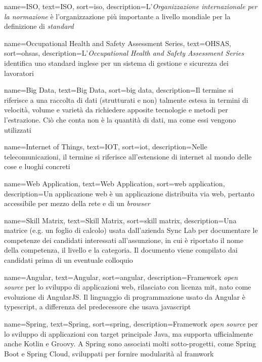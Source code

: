 {
    name=ISO,
    text=ISO,
    sort=iso,
    description={L'\emph{Organizzazione internazionale per la normazione} è l'organizzazione più importante a livello mondiale per la definizione di \textit{standard}}
}

{
    name=Occupational Health and Safety Assessment Series,
    text=OHSAS,
    sort=ohsas,
    description={L'\emph{Occupational Health and Safety Assessment Series} identifica uno standard inglese per un sistema di gestione e sicurezza dei lavoratori}
}

{
    name=Big Data,
    text=Big Data,
    sort=big data,
    description={Il termine si riferisce a una raccolta di dati (strutturati e non) talmente estesa in termini di velocità, volume e varietà da richiedere apposite tecnologie e metodi per l'estrazione. Ciò che conta non è la quantità di dati, ma come essi vengono utilizzati}
}

{
    name=Internet of Things,
    text=IOT,
    sort=iot,
    description={Nelle telecomunicazioni, il termine si riferisce all'estensione di internet al mondo delle cose e luoghi concreti}
}

{
    name=Web Application,
    text=Web Application,
    sort=web application,
    description={Un applicazione web è un applicazione distribuita via web, pertanto accessibile per mezzo della rete e di un \emph{browser}}
}

{
    name=Skill Matrix,
    text=Skill Matrix,
    sort=skill matrix,
    description={Una matrice (e.g. un foglio di calcolo) usata dall'azienda Sync Lab per documentare le competenze dei candidati interessati all'assunzione, in cui è riportato il nome della competenza, il livello e la categoria. Il documento viene compilato dai candidati prima di un eventuale colloquio}
}

{
    name=Angular,
    text=Angular,
    sort=angular,
    description={Framework \textit{open source} per lo sviluppo di applicazioni web, rilasciato con licenza \gls{mit}, nato come evoluzione di AngularJS. Il linguaggio di programmazione usato da Angular è \gls{typescript}, a differenza del predecessore che usava \gls{javascript}}
}

{
    name=Spring,
    text=Spring,
    sort=spring,
    description={Framework \textit{open source} per lo sviluppo di applicazioni con target principale Java, ma supporta ufficialmente anche Kotlin e Groovy. A Spring sono associati molti sotto-progetti, come Spring Boot e Spring Cloud, sviluppati per fornire modularità al framwork}
}

